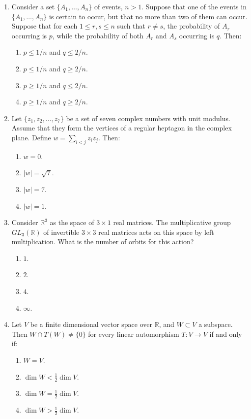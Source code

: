 \documentclass[11pt, a4paper]{article}
\begin{document}
\begin{enumerate}
  \item Consider a set $\{A_1, \dots, A_n\}$ of events, $n > 1$. Suppose that one of the events in $\{A_1, \dots, A_n\}$ is certain to occur, but that no more than two of them can occur. Suppose that for each $1 \le r, s \le n$ such that $r \ne s$, the probability of $A_r$ occurring is $p$, while the probability of both $A_r$ and $A_s$ occurring is $q$. Then:
  \begin{enumerate}[label=(\alph*)]
    \item $p \le 1/n$ and $q \le 2/n$.
    \item $p \le 1/n$ and $q \ge 2/n$.
    \item $p \ge 1/n$ and $q \le 2/n$.
    \item $p \ge 1/n$ and $q \ge 2/n$.
  \end{enumerate}

  \item Let $\{z_1, z_2, \dots, z_7\}$ be a set of seven complex numbers with unit modulus. Assume that they form the vertices of a regular heptagon in the complex plane. Define $w = \sum_{i < j} z_i z_j$. Then:
  \begin{enumerate}[label=(\alph*)]
    \item $w = 0$.
    \item $|w| = \sqrt{7}$.
    \item $|w| = 7$.
    \item $|w| = 1$.
  \end{enumerate}

  \item Consider $\mathbb{R}^3$ as the space of $3 \times 1$ real matrices. The multiplicative group $GL_3(\mathbb{R})$ of invertible $3 \times 3$ real matrices acts on this space by left multiplication. What is the number of orbits for this action?
  \begin{enumerate}[label=(\alph*)]
    \item $1$.
    \item $2$.
    \item $4$.
    \item $\infty$.
  \end{enumerate}

  \item Let $V$ be a finite dimensional vector space over $\mathbb{R}$, and $W \subset V$ a subspace. Then $W \cap T(W) \ne \{0\}$ for every linear automorphism $T: V \to V$ if and only if:
  \begin{enumerate}[label=(\alph*)]
    \item $W = V$.
    \item $\dim W < \frac{1}{2} \dim V$.
    \item $\dim W = \frac{1}{2} \dim V$.
    \item $\dim W > \frac{1}{2} \dim V$.
  \end{enumerate}


\end{enumerate}
\end{document}
